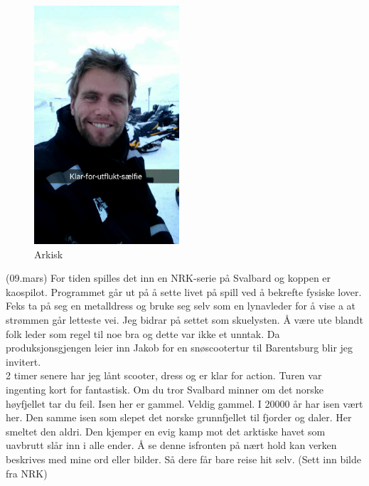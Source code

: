 \begin{figure}
	\begin{center}
	\includegraphics[width=0.48\textwidth]{klarforutsikselfie}
\end{center}
\caption{Arkisk}
\end{figure}

(09.mars)
For tiden spilles det inn en NRK-serie på Svalbard og koppen er
kaospilot. Programmet går ut på å sette livet på spill ved å bekrefte
fysiske lover. Feks ta på seg en metalldress og bruke seg selv som en
lynavleder for å vise a at strømmen går letteste vei. Jeg bidrar på
settet som skuelysten. Å være ute blandt folk leder som regel til noe 
bra og dette var ikke et unntak. Da produksjonsgjengen leier inn Jakob for en snøscootertur til
Barentsburg blir jeg invitert. \\

2 timer senere har jeg lånt scooter,
dress og er klar for action. Turen var ingenting kort for fantastisk.
Om du tror Svalbard minner om det norske høyfjellet tar du feil. Isen her er gammel.
Veldig gammel. I 20000 år har isen vært her. Den samme isen som slepet
det norske grunnfjellet til fjorder og daler. Her smeltet den aldri.
Den kjemper en evig kamp mot det arktiske havet som uavbrutt
slår inn i alle ender. Å se denne isfronten på nært hold kan verken
beskrives med mine ord eller bilder. Så dere får bare reise hit selv.
(Sett inn bilde fra NRK)\\

